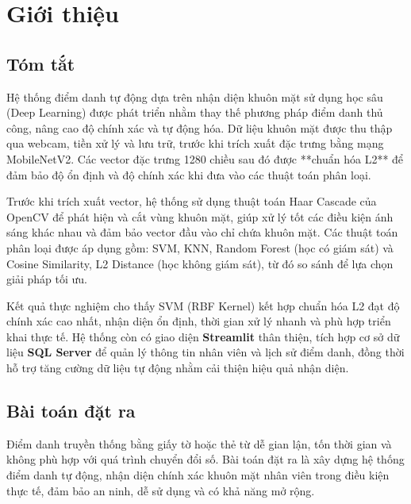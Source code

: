 \documentclass[a4paper]{book}
\begin{document}
\chapter{Giới thiệu}

\section{Tóm tắt}
Hệ thống điểm danh tự động dựa trên nhận diện khuôn mặt sử dụng học sâu (Deep Learning) được phát triển nhằm thay thế phương pháp điểm danh thủ công, nâng cao độ chính xác và tự động hóa. Dữ liệu khuôn mặt được thu thập qua webcam, tiền xử lý và lưu trữ, trước khi trích xuất đặc trưng bằng mạng MobileNetV2. Các vector đặc trưng 1280 chiều sau đó được **chuẩn hóa L2** để đảm bảo độ ổn định và độ chính xác khi đưa vào các thuật toán phân loại.

Trước khi trích xuất vector, hệ thống sử dụng thuật toán Haar Cascade của OpenCV để phát hiện và cắt vùng khuôn mặt, giúp xử lý tốt các điều kiện ánh sáng khác nhau và đảm bảo vector đầu vào chỉ chứa khuôn mặt. Các thuật toán phân loại được áp dụng gồm: SVM, KNN, Random Forest (học có giám sát) và Cosine Similarity, L2 Distance (học không giám sát), từ đó so sánh để lựa chọn giải pháp tối ưu.

Kết quả thực nghiệm cho thấy SVM (RBF Kernel) kết hợp chuẩn hóa L2 đạt độ chính xác cao nhất, nhận diện ổn định, thời gian xử lý nhanh và phù hợp triển khai thực tế. Hệ thống còn có giao diện \textbf{Streamlit} thân thiện, tích hợp cơ sở dữ liệu \textbf{SQL Server} để quản lý thông tin nhân viên và lịch sử điểm danh, đồng thời hỗ trợ tăng cường dữ liệu tự động nhằm cải thiện hiệu quả nhận diện.

\section{Bài toán đặt ra}
Điểm danh truyền thống bằng giấy tờ hoặc thẻ từ dễ gian lận, tốn thời gian và không phù hợp với quá trình chuyển đổi số. Bài toán đặt ra là xây dựng hệ thống điểm danh tự động, nhận diện chính xác khuôn mặt nhân viên trong điều kiện thực tế, đảm bảo an ninh, dễ sử dụng và có khả năng mở rộng.
\end{document}

